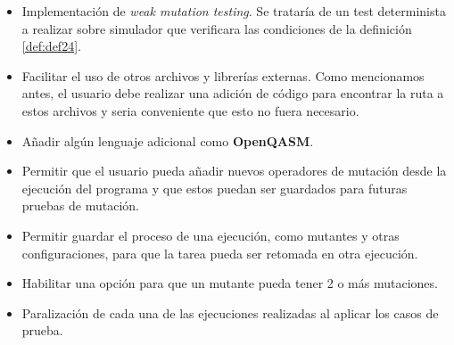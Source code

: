 \begin{itemize}
\item Implementación de \textit{weak mutation testing}. Se trataría de un test determinista a realizar sobre simulador que verificara las condiciones de la definición \ref{def:def24}.

\item Facilitar el uso de otros archivos y librerías externas. Como mencionamos antes, el usuario debe realizar una adición de código para encontrar la ruta a estos archivos y seria conveniente que esto no fuera necesario.

\item Añadir algún lenguaje adicional como \textbf{OpenQASM}.

\item Permitir que el usuario pueda añadir nuevos operadores de mutación desde la ejecución del programa y que estos puedan ser guardados para futuras pruebas de mutación.

\item Permitir guardar el proceso de una ejecución, como mutantes y otras configuraciones, para que la tarea pueda ser retomada en otra ejecución.

\item Habilitar una opción para que un mutante pueda tener 2 o más mutaciones.

\item Paralización de cada una de las ejecuciones realizadas al aplicar los casos de prueba.
\end{itemize}